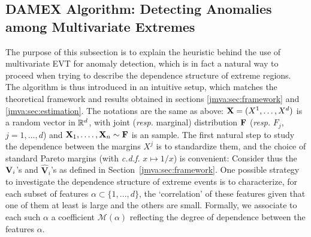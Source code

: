 \subsection{DAMEX Algorithm:  Detecting Anomalies among Multivariate  Extremes}\label{jmva:sec:algo}
The purpose of this subsection is to explain the heuristic behind the
use of multivariate EVT for anomaly detection, which is in fact a
natural way to proceed when trying to describe the dependence
structure of extreme regions. The algorithm is thus introduced in an
intuitive setup,  which matches the theoretical framework and results obtained in sections \ref{jmva:sec:framework} and \ref{jmva:sec:estimation}.
The notations are the same as above:  $\mathbf X = (X^1,\ldots,X^d)$ is a
random vector in $\mathbb{R}^d$, with joint (\emph{resp.} marginal)
distribution $\mathbf F$ (\emph{resp.} $F_j$, $j =1,\ldots,d$)  and $\mathbf
X_1,.\ldots, \mathbf X_n \sim \mathbf F$ is an \iid  sample.
The first natural step to study the dependence between the margins $X^j$ is to
standardize them, and the choice of standard Pareto margins (with
\emph{c.d.f.} 
$x \mapsto 1/x$) is convenient: Consider thus the $\mathbf V_i$'s and $\mathbf{\widehat V}_i$'s as defined in Section~\ref{jmva:sec:framework}.
%
One possible strategy  to investigate the dependence structure of
extreme events is to characterize, for each subset of features $\alpha
\subset \{1,...,d\}$, the `correlation' of these features given that
one of them at least  is large and the others are small. Formally, we
associate to each such $\alpha$ a coefficient $\mathcal{M}(\alpha)$ %
reflecting the degree of dependence between the features $\alpha$.
%
